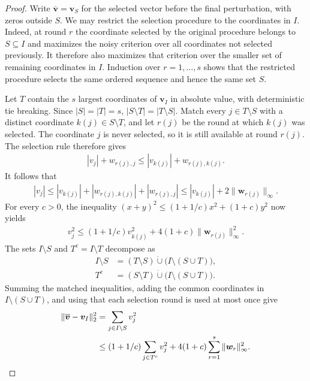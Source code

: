 \documentclass[letterpaper,12pt]{article}
\numberwithin{equation}{section}
\theoremstyle{plain}
\numberwithin{Theorem}{section}
\numberwithin{proposition}{section}
\numberwithin{Lemma}{section}
{
	\theoremstyle{definition}
	\newtheorem{Definition}{Definition}
	\newtheorem{example}{Example}
	\numberwithin{example}{section}
	\newtheorem{fact}{Fact}
	\numberwithin{fact}{section}
	\newtheorem{remark}{Remark}
}
\newcommand{\1}{\mathbbm{1}}
\begin{document}
\begin{proof}
Write $\overline{\bm v}=\bm v_S$ for the selected vector before the
final perturbation, with zeros outside $S$.  We may restrict the
selection procedure to the coordinates in $I$.  Indeed, at round $r$
the coordinate selected by the original procedure belongs to
$S\subseteq I$ and maximizes the noisy criterion over all coordinates
not selected previously.  It therefore also maximizes that criterion
over the smaller set of remaining coordinates in $I$.  Induction over
$r=1,\ldots,s$ shows that the restricted procedure selects the same
ordered sequence and hence the same set $S$.

Let $T$ contain the $s$ largest coordinates of $\bm v_I$ in absolute
value, with deterministic tie breaking.  Since $|S|=|T|=s$,
$|S\setminus T|=|T\setminus S|$.  Match every
$j\in T\setminus S$ with a distinct coordinate
$k(j)\in S\setminus T$, and let $r(j)$ be the round at which $k(j)$
was selected.  The coordinate $j$ is never selected, so it is still
available at round $r(j)$.  The selection rule therefore gives
\begin{align*}
    |v_j|+w_{r(j),j}
    \leq |v_{k(j)}|+w_{r(j),k(j)}.
\end{align*}
It follows that
\begin{align*}
    |v_j|
    \leq |v_{k(j)}|
       +|w_{r(j),k(j)}|+|w_{r(j),j}|
    \leq |v_{k(j)}|+2\|\bm w_{r(j)}\|_\infty.
\end{align*}
For every $c>0$, the inequality
$(x+y)^2\leq(1+1/c)x^2+(1+c)y^2$ now yields
\begin{align*}
    v_j^2
    \leq (1+1/c)v_{k(j)}^2
    +4(1+c)\|\bm w_{r(j)}\|_\infty^2.
\end{align*}
The sets $I\setminus S$ and $T^c=I\setminus T$ decompose as
\begin{align*}
I\setminus S
&=(T\setminus S)\mathbin{\dot\cup}
  \bigl(I\setminus(S\cup T)\bigr),\\
T^c
&=(S\setminus T)\mathbin{\dot\cup}
  \bigl(I\setminus(S\cup T)\bigr).
\end{align*}
Summing the matched inequalities, adding the common coordinates in
$I\setminus(S\cup T)$, and using that each selection round is used at
most once give
\begin{align}
\|\overline{\bm v}-\bm v_I\|_2^2
&=\sum_{j\in I\setminus S}v_j^2\notag\\
&\leq(1+1/c)\sum_{j\in T^c}v_j^2
 +4(1+c)\sum_{r=1}^s\|\bm w_r\|_\infty^2.                \label{eq: noisy projection intermediate}
\end{align}


\end{proof}
\end{document}
